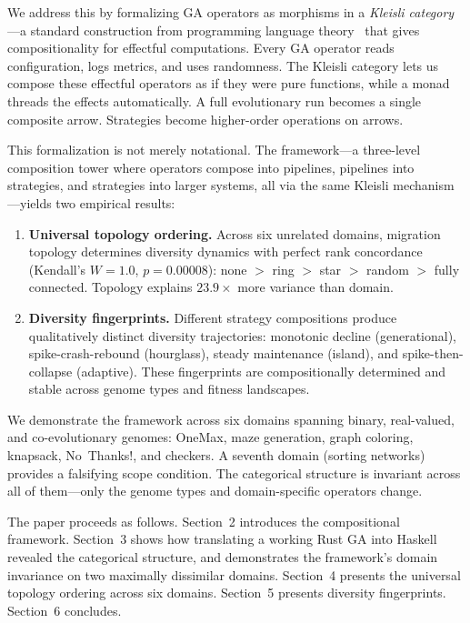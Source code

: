 \documentclass[dvipsnames,format=sigconf,anonymous=false,review=false]{acmart}
\begin{document}
We address this by formalizing GA operators as morphisms in a \emph{Kleisli category}---a standard construction from programming language theory~\cite{moggi1991notions} that gives compositionality for effectful computations. Every GA operator reads configuration, logs metrics, and uses randomness. The Kleisli category lets us compose these effectful operators as if they were pure functions, while a monad threads the effects automatically. A full evolutionary run becomes a single composite arrow. Strategies become higher-order operations on arrows.

This formalization is not merely notational. The framework---a three-level composition tower where operators compose into pipelines, pipelines into strategies, and strategies into larger systems, all via the same Kleisli mechanism---yields two empirical results:

\begin{enumerate}[nosep]
  \item \textbf{Universal topology ordering.} Across six unrelated domains, migration topology determines diversity dynamics with perfect rank concordance (Kendall's $W = 1.0$, $p = 0.00008$): none $>$ ring $>$ star $>$ random $>$ fully connected. Topology explains $23.9\times$ more variance than domain.

  \item \textbf{Diversity fingerprints.} Different strategy compositions produce qualitatively distinct diversity trajectories: monotonic decline (generational), spike-crash-rebound (hourglass), steady maintenance (island), and spike-then-collapse (adaptive). These fingerprints are compositionally determined and stable across genome types and fitness landscapes.
\end{enumerate}

We demonstrate the framework across six domains spanning binary, real-valued, and co-evolutionary genomes: OneMax, maze generation, graph coloring, knapsack, No~Thanks!, and checkers. A seventh domain (sorting networks) provides a falsifying scope condition. The categorical structure is invariant across all of them---only the genome types and domain-specific operators change.

The paper proceeds as follows. Section~2 introduces the compositional framework. Section~3 shows how translating a working Rust GA into Haskell revealed the categorical structure, and demonstrates the framework's domain invariance on two maximally dissimilar domains. Section~4 presents the universal topology ordering across six domains. Section~5 presents diversity fingerprints. Section~6 concludes.
\end{document}
